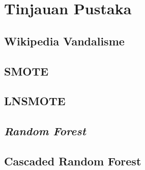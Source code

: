 \chapter{Tinjauan Pustaka}

\section{Wikipedia Vandalisme}



\section{SMOTE}



\section{LNSMOTE}


\section{\textit{Random Forest}}


\section{Cascaded Random Forest}
